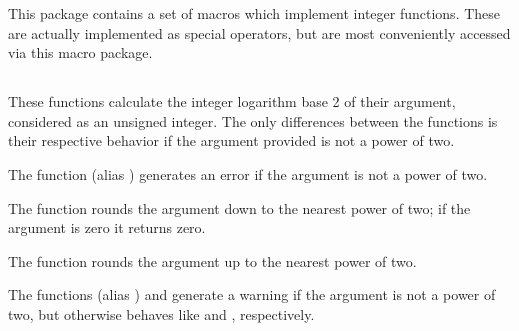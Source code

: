 
This package contains a set of macros which implement integer
functions. These are actually implemented as special operators, but
are most conveniently accessed via this macro package.

\subsection{}
\label{subsec:ilog2}

These functions calculate the integer logarithm base 2 of their
argument, considered as an unsigned integer. The only differences
between the functions is their respective behavior if the argument
provided is not a power of two.

The function  (alias ) generates
an error if the argument is not a power of two.

The function  rounds the argument down to the nearest
power of two; if the argument is zero it returns zero.

The function  rounds the argument up to the nearest
power of two.

The functions  (alias ) and
 generate a warning if the argument is not a power of
two, but otherwise behaves like  and ,
respectively.
